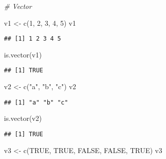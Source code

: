 \documentclass[
]{article}
\newenvironment{Shaded}{\begin{snugshade}}{\end{snugshade}}
\newcommand{\CommentTok}[1]{\textcolor[rgb]{0.56,0.35,0.01}{\textit{#1}}}
\newcommand{\ConstantTok}[1]{\textcolor[rgb]{0.00,0.00,0.00}{#1}}
\newcommand{\DecValTok}[1]{\textcolor[rgb]{0.00,0.00,0.81}{#1}}
\newcommand{\FunctionTok}[1]{\textcolor[rgb]{0.00,0.00,0.00}{#1}}
\newcommand{\NormalTok}[1]{#1}
\newcommand{\OtherTok}[1]{\textcolor[rgb]{0.56,0.35,0.01}{#1}}
\newcommand{\StringTok}[1]{\textcolor[rgb]{0.31,0.60,0.02}{#1}}
\begin{document}
\begin{Shaded}
\begin{Highlighting}[]
\CommentTok{\# Vector}

\NormalTok{v1 }\OtherTok{\textless{}{-}} \FunctionTok{c}\NormalTok{(}\DecValTok{1}\NormalTok{, }\DecValTok{2}\NormalTok{, }\DecValTok{3}\NormalTok{, }\DecValTok{4}\NormalTok{, }\DecValTok{5}\NormalTok{)}
\NormalTok{v1}
\end{Highlighting}
\end{Shaded}

\begin{verbatim}
## [1] 1 2 3 4 5
\end{verbatim}

\begin{Shaded}
\begin{Highlighting}[]
\FunctionTok{is.vector}\NormalTok{(v1)}
\end{Highlighting}
\end{Shaded}

\begin{verbatim}
## [1] TRUE
\end{verbatim}

\begin{Shaded}
\begin{Highlighting}[]
\NormalTok{v2 }\OtherTok{\textless{}{-}} \FunctionTok{c}\NormalTok{(}\StringTok{"a"}\NormalTok{, }\StringTok{"b"}\NormalTok{, }\StringTok{"c"}\NormalTok{)}
\NormalTok{v2}
\end{Highlighting}
\end{Shaded}

\begin{verbatim}
## [1] "a" "b" "c"
\end{verbatim}

\begin{Shaded}
\begin{Highlighting}[]
\FunctionTok{is.vector}\NormalTok{(v2)}
\end{Highlighting}
\end{Shaded}

\begin{verbatim}
## [1] TRUE
\end{verbatim}

\begin{Shaded}
\begin{Highlighting}[]
\NormalTok{v3 }\OtherTok{\textless{}{-}} \FunctionTok{c}\NormalTok{(}\ConstantTok{TRUE}\NormalTok{, }\ConstantTok{TRUE}\NormalTok{, }\ConstantTok{FALSE}\NormalTok{, }\ConstantTok{FALSE}\NormalTok{, }\ConstantTok{TRUE}\NormalTok{)}
\NormalTok{v3}
\end{Highlighting}
\end{Shaded}
\end{document}
